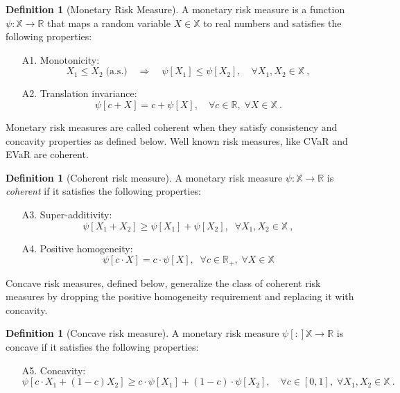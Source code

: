 \documentclass[twoside]{article}
\newcommand{\risk}[1]{\psi \left[#1\right]}
\newcommand{\risko}{\psi}
\newcommand{\Real}{\mathbb{R}}
\theoremstyle{plain}
\theoremstyle{definition}
\newtheorem{definition}[theorem]{Definition}
\theoremstyle{remark}
\begin{document}
\begin{definition}[Monetary Risk Measure]
\label{ent:def:risk}
A monetary risk measure is a function $\risko\colon \mathbb X\rightarrow\mathbb R$ that maps a random variable $X\in\mathbb X$ to real numbers and satisfies the following properties:
\begin{itemize}[nosep]
\item[A1.] Monotonicity:
  \[
    X_1 \leq X_2 \; \text{(a.s.)} \quad \Longrightarrow \quad \risk{X_1} \leq \risk{X_2},\quad \forall X_1,X_2\in\mathbb X~,
  \]
\item[A2.] Translation invariance:
  \[
    \risk{c+X} = c + \risk{X},\quad \forall c\in\mathbb R,\;\forall X\in\mathbb X ~.
  \] 
\end{itemize}
\end{definition}

Monetary risk measures are called coherent when they satisfy consistency and concavity properties as defined below. Well known risk measures, like CVaR and EVaR are coherent.
\begin{definition}[Coherent risk measure] \label{ent:def:coherent-risk}
A monetary risk measure $\risko\colon \mathbb{X} \to  \Real $ is \emph{coherent} if it satisfies the following properties:
%
\begin{itemize}[nosep]
\item[A3.] Super-additivity:
  \[
    \risk{X_1 + X_2} \geq \risk{X_1} + \risk{X_2},\;\;\forall X_1,X_2\in\mathbb X
  ~,\]
\item[A4.] Positive homogeneity:
  \[
    \risk{c \cdot X} = c\cdot \risk{X},\;\;\forall c\in\mathbb {R}_+,\;\forall X\in\mathbb X
  \]
\end{itemize}
%
\end{definition}

Concave risk measures, defined below, generalize the class of coherent risk measures by dropping the positive homogeneity requirement and replacing it with concavity. 
\begin{definition}[Concave risk measure] \label{ent:def:concave-risk}
A monetary risk measure $\risk\colon \mathbb{X} \to \Real$ is concave if it satisfies the following properties:
\begin{itemize}[nosep]
\item[A5.] Concavity: 
  \[
    \risk{c\cdot X_1 + (1 - c)X_2} \geq c\cdot \risk{X_1} + (1 - c)\cdot \risk{X_2},\quad \forall c\in[0,1],\;\forall X_1,X_2\in\mathbb X~.
  \]
\end{itemize}
\end{definition}
\end{document}
